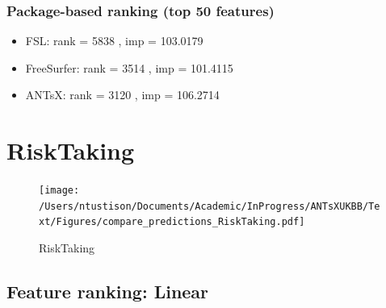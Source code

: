 \documentclass[
  10pt,
]{article}
\begin{document}
\hypertarget{package-based-ranking-top-50-features-7}{%
\subsubsection{Package-based ranking (top 50
features)}\label{package-based-ranking-top-50-features-7}}

\begin{itemize}
\item
  FSL: rank = 5838 , imp = 103.0179
\item
  FreeSurfer: rank = 3514 , imp = 101.4115
\item
  ANTsX: rank = 3120 , imp = 106.2714
\end{itemize}

\clearpage

\hypertarget{risktaking}{%
\section{RiskTaking}\label{risktaking}}

\begin{figure}
\centering
\texttt{[image: /Users/ntustison/Documents/Academic/InProgress/ANTsXUKBB/Text/Figures/compare\_predictions\_RiskTaking.pdf]}
\caption{RiskTaking}
\end{figure}

\hypertarget{feature-ranking-linear-6}{%
\subsection{Feature ranking: Linear}\label{feature-ranking-linear-6}}
\end{document}
